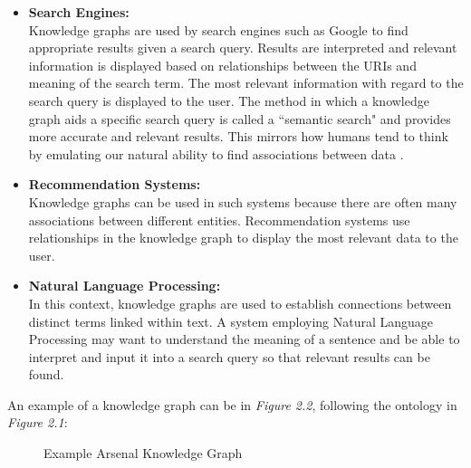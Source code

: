 \vspace{-0.1cm}
\begin{itemize}
\itemsep0em 
\item \textbf{Search Engines:} \\Knowledge graphs are used by search engines such as Google to find appropriate results given a search query. Results are interpreted and relevant information is displayed based on relationships between the URIs and meaning of the search term. The most relevant information with regard to the search query is displayed to the user. The method in which a knowledge graph aids a specific search query is called a ``semantic search" and provides more accurate and relevant results. This mirrors how humans tend to think by emulating our natural ability to find associations between data \cite{searchengine}.  

\item \textbf{Recommendation Systems:} \\Knowledge graphs can be used in such systems because there are often many associations between different entities. Recommendation systems use relationships in the knowledge graph to display the most relevant data to the user. 

\item \textbf{Natural Language Processing:}\\ In this context, knowledge graphs are used to establish connections between distinct terms linked within text. A system employing Natural Language Processing may want to understand the meaning of a sentence and be able to interpret and input it into a search query so that relevant results can be found. 
\end{itemize}

An example of a knowledge graph can be in \textit{Figure 2.2}, following the ontology in \textit{Figure 2.1}:

\begin{figure}[H]
\begin{center}
\end{center}
\vspace{-0.4cm}
\caption{Example Arsenal Knowledge Graph}
\end{figure}
\vspace{-0.1cm}

